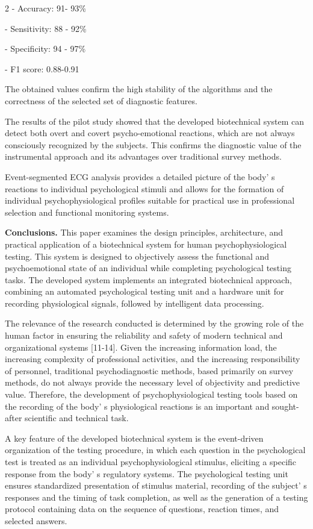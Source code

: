 \begin{multicols}{2}
- Accuracy: 91- 93\%

- Sensitivity: 88 - 92\%

- Specificity: 94 - 97\%

- F1 score: 0.88-0.91

The obtained values confirm the high stability of the algorithms and the
correctness of the selected set of diagnostic features.

The results of the pilot study showed that the developed biotechnical
system can detect both overt and covert psycho-emotional reactions,
which are not always consciously recognized by the subjects. This
confirms the diagnostic value of the instrumental approach and its
advantages over traditional survey methods.

Event-segmented ECG analysis provides a detailed picture of the
body' s reactions to individual psychological stimuli and
allows for the formation of individual psychophysiological profiles
suitable for practical use in professional selection and functional
monitoring systems.

{\bfseries Conclusions.} This paper examines the design principles,
architecture, and practical application of a biotechnical system for
human psychophysiological testing. This system is designed to
objectively assess the functional and psychoemotional state of an
individual while completing psychological testing tasks. The developed
system implements an integrated biotechnical approach, combining an
automated psychological testing unit and a hardware unit for recording
physiological signals, followed by intelligent data processing.

The relevance of the research conducted is determined by the growing
role of the human factor in ensuring the reliability and safety of
modern technical and organizational systems {[}11-14{]}. Given the
increasing information load, the increasing complexity of professional
activities, and the increasing responsibility of personnel, traditional
psychodiagnostic methods, based primarily on survey methods, do not
always provide the necessary level of objectivity and predictive value.
Therefore, the development of psychophysiological testing tools based on
the recording of the body' s physiological reactions is
an important and sought-after scientific and technical task.

A key feature of the developed biotechnical system is the event-driven
organization of the testing procedure, in which each question in the
psychological test is treated as an individual psychophysiological
stimulus, eliciting a specific response from the body' s
regulatory systems. The psychological testing unit ensures standardized
presentation of stimulus material, recording of the
subject' s responses and the timing of task completion,
as well as the generation of a testing protocol containing data on the
sequence of questions, reaction times, and selected answers.


\end{multicols}
